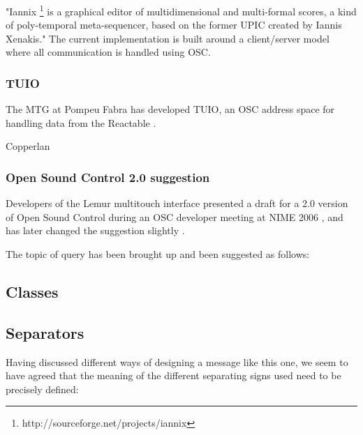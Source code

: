 \documentclass{sig-alternate}
\begin{document}
"Iannix \footnote{http://sourceforge.net/projects/iannix} is a graphical editor of multidimensional and multi-formal scores, a kind of poly-temporal meta-sequencer, based on the former UPIC created by Iannis Xenakis." The current implementation is built around a client/server model where all communication is handled using OSC. 

\cite{Coduys:2004}


\subsubsection{TUIO}

The MTG at Pompeu Fabra has developed TUIO, an OSC address space for handling data from the Reactable \cite{Kaltenbrunner:2005}.

Copperlan

\subsubsection{Open Sound Control 2.0 suggestion}

Developers of the Lemur multitouch interface presented a draft for a 2.0 version of Open Sound Control during an OSC developer meeting at NIME 2006 \cite{Jazzmutant:2006}, and has later changed the suggestion slightly \cite{Jazzmutant:2007}. 

The topic of query has been brought up and been suggested as follows: 






\subsection{Classes} %
\label{sub:classes}





\subsection{Separators} %
\label{sub:separators}


Having discussed different ways of designing a message like this one, we seem to have agreed that the meaning of the different separating signs used need to be precisely defined:
\end{document}
